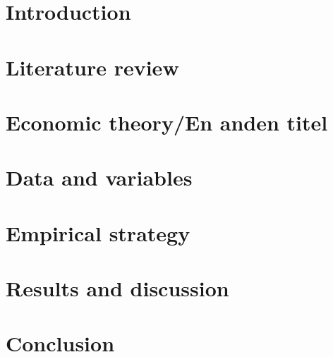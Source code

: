 


















\maketitle
\pagestyle{empty}
\clearpage

\small {
\tableofcontents
\listoffigures
\listoftables
}
\clearpage
\pagestyle{scrheadings}

\section{Introduction}


\section{Literature review}


\section{Economic theory/En anden titel}


\section{Data and variables}


\section{Empirical strategy}


\section{Results and discussion}


\section{Conclusion}


\clearpage
\printbibliography
\clearpage

\appendix
\renewcommand\thefigure{\thesection.\arabic{figure}}
\setcounter{figure}{0}
\setcounter{page}{1}


\clearpage

\clearpage




